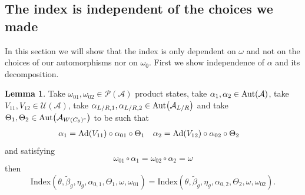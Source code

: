 \documentclass[12pt,a4paper,twoside]{article}
\let\originalleft\left
\let\originalright\right
\renewcommand{\left}{\mathopen{}\mathclose\bgroup\originalleft}
\renewcommand{\right}{\aftergroup\egroup\originalright}
\newcommand{\UU}{\mathcal U}
\newcommand{\PP}{\mathcal P}
\renewcommand{\AA}{\mathcal A}
\newcommand{\Ad}[1]{\textrm{Ad}\left(#1\right)}
\newcommand{\Aut}[1]{\textrm{Aut}\left(#1\right)}
\theoremstyle{definition}
\newtheorem{lemma}[theorem]{Lemma}
\numberwithin{equation}{section}
\begin{document}
\subsection{The index is independent of the choices we made}\label{sec:IndexIsInvariantUnderChoices}
In this section we will show that the index is only dependent on $\omega$ and not on the choices of our automorphisms nor on $\omega_0$. First we show independence of $\alpha$ and its decomposition.
\begin{lemma}
	Take $\omega_{01},\omega_{02}\in\PP(\AA)$ product states, take $\alpha_1,\alpha_2\in\Aut{\AA}$, take $V_{11},V_{12}\in\UU(\AA)$, take $\alpha_{L/R,1},\alpha_{L/R,2}\in\Aut{\AA_{L/R}}$ and take $\Theta_1,\Theta_2\in \Aut{\AA_{W(C_\theta)^c}}$ to be such that
	\begin{align}
		\alpha_1&=\Ad{V_{11}}\circ\alpha_{01}\circ\Theta_1&\alpha_2&=\Ad{V_{12}}\circ\alpha_{02}\circ \Theta_2
	\end{align}
	and satisfying
	\begin{equation}
		\omega_{01}\circ\alpha_1=\omega_{02}\circ\alpha_2=\omega
	\end{equation}
	then
	\begin{equation}
		\textrm{Index}(\theta,\tilde{\beta}_g,\eta_g,\alpha_{0,1},\Theta_1,\omega,\omega_{01})=\textrm{Index}(\theta,\tilde{\beta}_g,\eta_g,\alpha_{0,2},\Theta_2,\omega,\omega_{02}).
	\end{equation}
\end{lemma}
\end{document}
